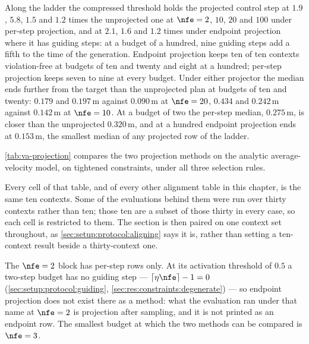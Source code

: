 Along the ladder the compressed threshold holds the projected control step at $1.9$, $5.8$, $1.5$ and
$1.2$ times the unprojected one at $\nfe=2$, $10$, $20$ and $100$ under per-step projection, and at $2.1$,
$1.6$ and $1.2$ times under endpoint projection where it has guiding steps: at a budget of a hundred,
nine guiding steps add a fifth to the time of the generation. Endpoint projection keeps ten of ten contexts
violation-free at budgets of ten and twenty and eight at a hundred; per-step projection keeps seven to nine at
every budget. Under either projector the median ends further from the target than the unprojected plan at
budgets of ten and twenty: $0.179$ and $0.197$\,m against $0.090$\,m at $\nfe=20$, $0.434$ and $0.242$\,m
against $0.142$\,m at $\nfe=10$. At a budget of two the per-step median, $0.275$\,m, is closer than the
unprojected $0.320$\,m, and at a hundred endpoint projection ends at $0.153$\,m, the smallest median of any
projected row of the ladder.

\autoref{tab:va-projection} compares the two projection methods on the analytic average-velocity model,
on tightened constraints, under all three selection rules.

Every cell of that table, and of every other alignment table in this chapter, is the same ten contexts.
Some of the evaluations behind them were run over thirty contexts rather than ten; those ten are a subset
of those thirty in every case, so each cell is restricted to them. The section is then paired on one
context set throughout, as \autoref{sec:setup:protocol:aligning} says it is, rather than setting a
ten-context result beside a thirty-context one.

The $\nfe=2$ block has per-step rows only. At its activation threshold of $0.5$ a two-step budget has no
guiding step --- $\lceil \eta\nfe\rceil - 1 = 0$ (\autoref{sec:setup:protocol:guiding},
\autoref{sec:res:constraints:degenerate}) --- so endpoint projection does not exist there as a method: what
the evaluation ran under that name at $\nfe=2$ is projection after sampling, and it is not printed as an
endpoint row. The smallest budget at which the two methods can be compared is $\nfe=3$.

